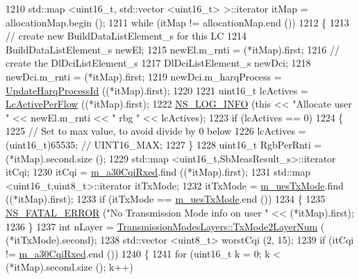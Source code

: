 \begin{DoxyCode}
1210   std::map <uint16\_t, std::vector <uint16\_t> >::iterator itMap = allocationMap.begin ();
1211   \textcolor{keywordflow}{while} (itMap != allocationMap.end ())
1212     \{
1213       \textcolor{comment}{// create new BuildDataListElement\_s for this LC}
1214       BuildDataListElement\_s newEl;
1215       newEl.m\_rnti = (*itMap).first;
1216       \textcolor{comment}{// create the DlDciListElement\_s}
1217       DlDciListElement\_s newDci;
1218       newDci.m\_rnti = (*itMap).first;
1219       newDci.m\_harqProcess = \hyperlink{classns3_1_1TdTbfqFfMacScheduler_a521baa680048ecfaba2eb55dacae5600}{UpdateHarqProcessId} ((*itMap).first);
1220 
1221       uint16\_t lcActives = \hyperlink{classns3_1_1TdTbfqFfMacScheduler_af59fe1b38ec5ca5d51393c9d3a99375c}{LcActivePerFlow} ((*itMap).first);
1222       \hyperlink{group__logging_gafbd73ee2cf9f26b319f49086d8e860fb}{NS\_LOG\_INFO} (\textcolor{keyword}{this} << \textcolor{stringliteral}{"Allocate user "} << newEl.m\_rnti << \textcolor{stringliteral}{" rbg "} << lcActives);
1223       \textcolor{keywordflow}{if} (lcActives == 0)
1224         \{
1225           \textcolor{comment}{// Set to max value, to avoid divide by 0 below}
1226           lcActives = (uint16\_t)65535; \textcolor{comment}{// UINT16\_MAX;}
1227         \}
1228       uint16\_t RgbPerRnti = (*itMap).second.size ();
1229       std::map <uint16\_t,SbMeasResult\_s>::iterator itCqi;
1230       itCqi = \hyperlink{classns3_1_1TdTbfqFfMacScheduler_a6523ed7737d8e753380a1207becdae8a}{m\_a30CqiRxed}.find ((*itMap).first);
1231       std::map <uint16\_t,uint8\_t>::iterator itTxMode;
1232       itTxMode = \hyperlink{classns3_1_1TdTbfqFfMacScheduler_a81895414769458c1204040d901d7bba7}{m\_uesTxMode}.find ((*itMap).first);
1233       \textcolor{keywordflow}{if} (itTxMode == \hyperlink{classns3_1_1TdTbfqFfMacScheduler_a81895414769458c1204040d901d7bba7}{m\_uesTxMode}.end ())
1234         \{
1235           \hyperlink{group__fatal_ga5131d5e3f75d7d4cbfd706ac456fdc85}{NS\_FATAL\_ERROR} (\textcolor{stringliteral}{"No Transmission Mode info on user "} << (*itMap).first);
1236         \}
1237       \textcolor{keywordtype}{int} nLayer = \hyperlink{classns3_1_1TransmissionModesLayers_a31f608b7bfaa77440fe4cb85ad035329}{TransmissionModesLayers::TxMode2LayerNum} (
      (*itTxMode).second);
1238       std::vector <uint8\_t> worstCqi (2, 15);
1239       \textcolor{keywordflow}{if} (itCqi != \hyperlink{classns3_1_1TdTbfqFfMacScheduler_a6523ed7737d8e753380a1207becdae8a}{m\_a30CqiRxed}.end ())
1240         \{
1241           \textcolor{keywordflow}{for} (uint16\_t k = 0; k < (*itMap).second.size (); k++)

\end{DoxyCode}
